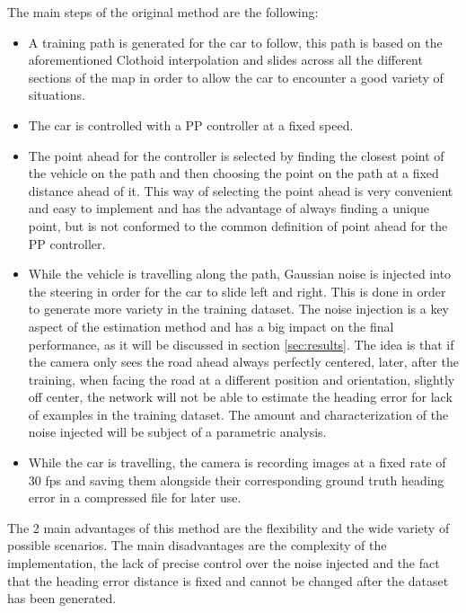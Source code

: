 \documentclass[a4paper,12pt,sort&compress]{article}
\begin{document}
The main steps of the original method are the following:
\begin{itemize}
    \item A training path is generated for the car to follow, this path is based on the
    aforementioned Clothoid interpolation and slides across all the different sections of the map in
    order to allow the car to encounter a good variety of situations.
    \item The car is controlled with a PP controller at a fixed speed. 
    \item The point ahead for the controller is selected by finding the closest point of the vehicle
    on the path and then choosing the point on the path at a fixed distance ahead of it. This way of
    selecting the point ahead is very convenient and easy to implement and has the advantage of
    always finding a unique point, but is not conformed to the common definition of point ahead for
    the PP controller. 
    \item While the vehicle is travelling along the path, Gaussian noise is injected into the
    steering in order for the car to slide left and right. This is done in order to generate more
    variety in the training dataset. The noise injection is a key aspect of the estimation method
    and has a big impact on the final performance, as it will be discussed in section
    \ref*{sec:results}. The idea is that if the camera only sees the road ahead always perfectly
    centered, later, after the training, when facing the road at a different position and
    orientation, slightly off center, the network will not be able to estimate the heading error for
    lack of examples in the training dataset. The amount and characterization of the noise injected
    will be subject of a parametric analysis.
    \item While the car is travelling, the camera is recording images at a fixed rate of 30 fps and
    saving them alongside their corresponding ground truth heading error in a compressed file for
    later use. 
\end{itemize}
The 2 main advantages of this method are the flexibility and the wide variety of possible scenarios.
The main disadvantages are the complexity of the implementation, the lack of precise control over
the noise injected and the fact that the heading error distance is fixed and cannot be changed after
the dataset has been generated.
\end{document}
